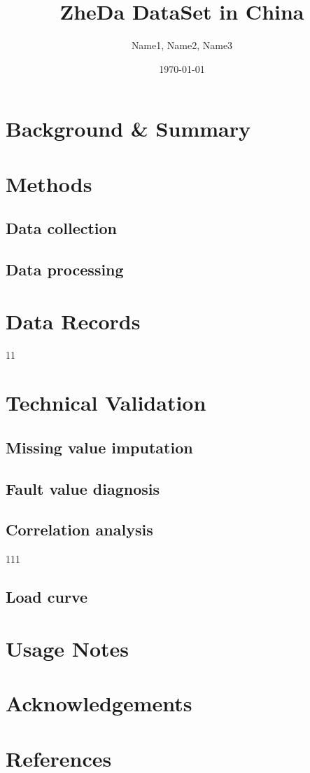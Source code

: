 \documentclass[12pt]{article}
\title{ZheDa DataSet in China}
\author{Name1, Name2, Name3}
\date{\today}
\begin{document}
\maketitle

\begin{abstract}
\end{abstract}

\section*{Background \& Summary}

\section*{Methods}
\subsection*{Data collection}

\subsection*{Data processing}

\section*{Data Records}
11
\section*{Technical Validation}
\subsection*{Missing value imputation}

\subsection*{Fault value diagnosis}

\subsection*{Correlation analysis}
111\cite{example1}
\subsection*{Load curve}

\section*{Usage Notes}

\section*{Acknowledgements}

\section*{References}
\end{document}
